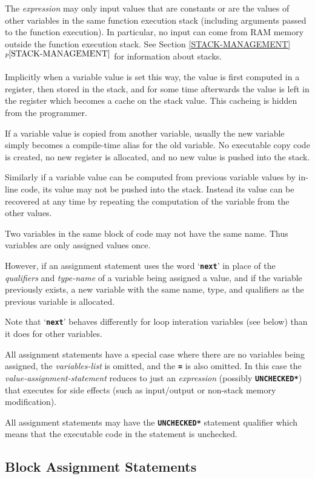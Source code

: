 \documentclass[12pt]{article}
\newcommand{\TT}[1]{{\tt \bfseries #1}}
\newcommand{\itemref}[1]{\ref{#1}$^{p\pageref{#1}}$}
\begin{document}
The {\em expression} may only input values that are constants or are
the values of other variables in the same function execution
stack (including
arguments passed to the function execution).  In particular,
no input can come from RAM memory outside the function execution stack.
See Section \itemref{STACK-MANAGEMENT} for information about stacks.

Implicitly when a variable value is set this way, the value is first
computed in a register, then stored in the stack, and for some time
afterwards the value is left in the register which becomes a cache
on the stack value.  This cacheing is hidden from the programmer.

If a variable value is copied from another variable, usually the
new variable simply becomes a compile-time alias for the old variable.
No executable copy code is created, no new register is allocated, and no new
value is pushed into the stack.

Similarly if a variable value can be computed from previous variable
values by in-line code, 
its value may not be pushed into the stack.  Instead its
value can be recovered at any time by repeating the computation
of the variable from the other values.

Two variables in the same block of code may not have the same
name.  Thus variables are only assigned values once.

However, if an assignment statement uses the word `\TT{next}' in
place of the {\em qualifiers} and {\em type-name}
of a variable being assigned a value, and
if the variable previously exists, a new variable with the same
name, type, and qualifiers as the previous variable is allocated.

Note that `\TT{next}' behaves differently for loop interation
variables (see below) than it does for other variables.

All assignment statements have a special case where there are
no variables being assigned, the {\em variables-list} is omitted,
and the \TT{=} is also omitted.  In this case the
{\em value-assignment-statement} reduces to just an {\em expression}
(possibly \TT{*UNCHECKED*}) that executes for side effects (such as
input/output or non-stack memory modification).

All assignment statements may have the \TT{*UNCHECKED*} statement
qualifier which means that the executable code in the statement
is unchecked.

\subsection{Block Assignment Statements}
\label{BlOCK-ASSIGNMENT-STATEMENTS}
\end{document}
